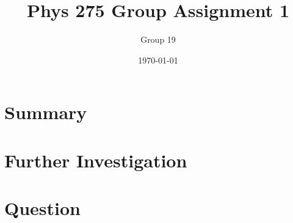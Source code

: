 \documentclass[10pt]{article}
\begin{document}
	\title{\textbf{Phys 275 Group Assignment 1}}
	\date{\today}
	\author{Group 19}
	\maketitle
	
	
	\newpage
	\section{Summary}

	\newpage
	\section{Further Investigation}

	\newpage
	\section{Question}

	\newpage
\end{document}
